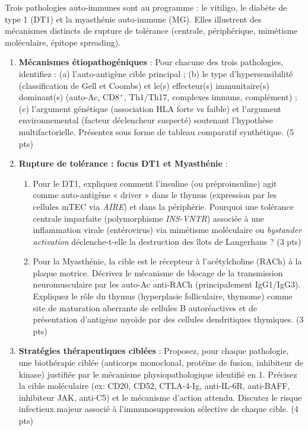 \documentclass[11pt]{article}
\begin{document}
\begin{exercice}
Trois pathologies auto-immunes sont au programme : le vitiligo, le diabète de type 1 (DT1) et la myasthénie auto-immune (MG). Elles illustrent des mécanismes distincts de rupture de tolérance (centrale, périphérique, mimétisme moléculaire, épitope spreading).

\begin{enumerate}
    \item \textbf{Mécanismes étiopathogéniques} : Pour chacune des trois pathologies, identifiez : (a) l'auto-antigène cible principal ; (b) le type d'hypersensibilité (classification de Gell et Coombs) et le(s) effecteur(s) immunitaire(s) dominant(s) (auto-Ac, CD8$^+$, Th1/Th17, complexes immuns, complément) ; (c) l'argument génétique (association HLA forte vs faible) et l'argument environnemental (facteur déclencheur suspecté) soutenant l'hypothèse multifactorielle. Présentez sous forme de tableau comparatif synthétique. (5 pts)
    \item \textbf{Rupture de tolérance : focus DT1 et Myasthénie} :
    \begin{enumerate}
        \item Pour le DT1, expliquez comment l'insuline (ou préproinsuline) agit comme auto-antigène « driver » dans le thymus (expression par les cellules mTEC via \textit{AIRE}) et dans la périphérie. Pourquoi une tolérance centrale imparfaite (polymorphisme \textit{INS-VNTR}) associée à une inflammation virale (entérovirus) via mimétisme moléculaire ou \textit{bystander activation} déclenche-t-elle la destruction des îlots de Langerhans ? (3 pts)
        \item Pour la Myasthénie, la cible est le récepteur à l'acétylcholine (RACh) à la plaque motrice. Décrivez le mécanisme de blocage de la transmission neuromusculaire par les auto-Ac anti-RACh (principalement IgG1/IgG3). Expliquez le rôle du thymus (hyperplasie folliculaire, thymome) comme site de maturation aberrante de cellules B autoréactives et de présentation d'antigène myoïde par des cellules dendritiques thymiques. (3 pts)
    \end{enumerate}
    \item \textbf{Stratégies thérapeutiques ciblées} : Proposez, pour chaque pathologie, une biothérapie ciblée (anticorps monoclonal, protéine de fusion, inhibiteur de kinase) justifiée par le mécanisme physiopathologique identifié en 1. Précisez la cible moléculaire (ex: CD20, CD52, CTLA-4-Ig, anti-IL-6R, anti-BAFF, inhibiteur JAK, anti-C5) et le mécanisme d'action attendu. Discutez le risque infectieux majeur associé à l'immunosuppression sélective de chaque cible. (4 pts)
\end{enumerate}
\end{exercice}
\end{document}
